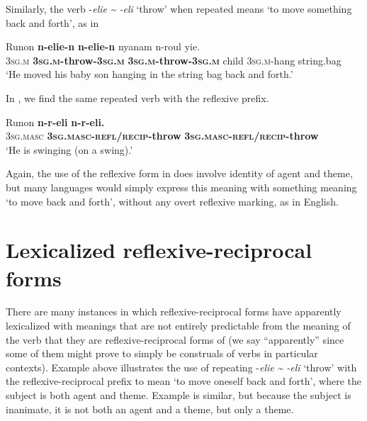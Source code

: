 \documentclass[output=paper]{langscibook}
\begin{document}
Similarly, the verb -\emph{elie} \emph{{\textasciitilde} -eli} ‘throw’ when repeated means ‘to move something back and forth’, as in 


\ea%
    \label{ex:Brown:31}
    \gll Runon  \textbf{n-elie-n}  \textbf{n-elie-n}  nyanam  n-roul  yie.\\
         \textsc{3sg.m}  \textbf{\textsc{3sg.m}}\textbf{{}-throw-}\textbf{\textsc{3sg.m}}  \textbf{\textsc{3sg.m}}\textbf{{}-throw-}\textbf{\textsc{3sg.m}}  child \textsc{3sg.m}{}-hang  string.bag\\
    \glt ‘He moved his baby son hanging in the string bag back and forth.’
    \z

In , we find the same repeated verb with the reflexive prefix.

\ea%
    \label{ex:Brown:32}
    \gll Runon  \textbf{n-r-eli}  \textbf{n-r-eli.}\\
 \textsc{3sg.masc}  \textbf{\textsc{3sg.masc-refl/recip}}\textbf{{}-throw}  \textbf{\textsc{3sg.masc-refl/recip}}\textbf{{}-throw}\\
    \glt  ‘He is swinging (on a swing).’
    \z


Again, the use of the reflexive form in  does involve identity of agent and theme, but many languages would simply express this meaning with something meaning ‘to move back and forth’, without any overt reflexive marking, as in English.



\section{Lexicalized reflexive-reciprocal forms }\label{sec:Brown:4}%



  There are many instances in which reflexive-reciprocal forms have apparently lexicalized with meanings that are not entirely predictable from the meaning of the verb that they are reflexive-reciprocal forms of (we say “apparently” since some of them might prove to simply be construals of verbs in particular contexts). Example  above illustrates the use of repeating -\emph{elie} \emph{{\textasciitilde} -eli} ‘throw’ with the reflexive-reciprocal prefix to mean ‘to move oneself back and forth’, where the subject is both agent and theme. Example  is similar, but because the subject is inanimate, it is not both an agent and a theme, but only a theme.
\end{document}
